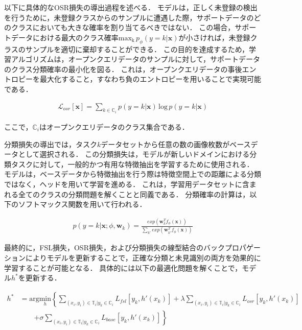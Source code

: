 \documentclass[a4paper,11pt,nomag]{jsreport}
\begin{document}
以下に具体的なOSR損失の導出過程を述べる．
モデルは，正しく未登録の検出を行うために，未登録クラスからのサンプルに遭遇した際，サポートデータのどのクラスにおいても大きな確率を割り当てるべきではない．
この場合，サポートデータにおける最大のクラス確率$ \mathrm{max_k}\,p_\phi(y=k|\mathbf{x}) $が小さければ，未登録クラスのサンプルを適切に棄却することができる．
この目的を達成するため，学習アルゴリズムは，オープンクエリデータのサンプルに対して，サポートデータのクラス分類確率の最小化を図る．
これは，オープンクエリデータの事後エントロピーを最大化すること，すなわち負のエントロピーを用いることで実現可能である．

\begin{align}
    \mathcal{L}_{osr}[\mathbf{x}]=\sum_{k\in\mathbb{C}_i}p(y=k|\mathbf{x})\,\textrm{log}\,p(y=k|\mathbf{x})
\end{align}

\noindent
ここで，$\mathbb{C}_i$はオープンクエリデータのクラス集合である．

分類損失の導出では，タスク$k$データセットから任意の数の画像枚数がベースデータとして選択される．
この分類損失は，モデルが新しいドメインにおける分類タスクに対して，一般的かつ有用な特徴抽出を学習するために使用される．
モデルは，ベースデータから特徴抽出を行う際は特徴空間上での距離による分類ではなく，ヘッドを用いて学習を進める．
これは，学習用データセットに含まれる全てのクラスの分類問題を解くことと同義である．
分類確率の計算は，以下のソフトマックス関数を用いて行われる．

\begin{align}
    p(y=k|\mathbf{x};\phi,\mathbf{w}_k)=\frac{exp(\mathbf{w}_k^Tf_{\phi}(\mathbf{x}))}{\sum_{k'}exp(\mathbf{w}_{k'}^Tf_{\phi}(\mathbf{x}))}
\end{align}

最終的に，FSL損失，OSR損失，および分類損失の線型結合のバックプロパゲーションによりモデルを更新することで，正確な分類と未見識別の両方を効果的に学習することが可能となる．
具体的には以下の最適化問題を解くことで，モデル$h^*$を更新する．

\begin{align}
    h^* & = \textrm{arg}\underset{h}{\textrm{min}}\left\{\sum_{(x_i,y_i)\in\mathbb{T}_i|y_k\in\mathbb{C}_i}L_{fsl}[y_k,h'(x_k)]+\lambda\sum_{(x_i,y_i)\in\mathbb{T}_i|y_k\in\mathbb{C}_i}L_{osr}[y_k,h'(x_k)]\right. \nonumber \\
        & \qquad \left.+ \sigma\sum_{(x_i,y_i)\in\mathbb{T}_i|y_k\in\mathbb{C}_i}L_{base}[y_k,h'(x_k)]\right\}
\end{align}
\end{document}
